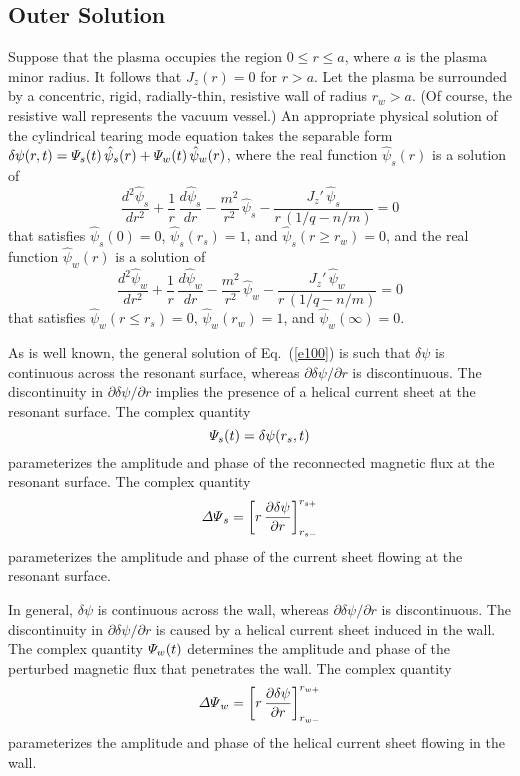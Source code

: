 \documentclass[12pt,prb,aps]{revtex4-1}
\begin{document}
\subsection{Outer Solution}\label{perfect}
Suppose that the plasma occupies the region $0\leq r\leq a$, where $a$ is the plasma  minor radius. It follows that
$J_z(r)=0$ for $r>a$. Let the plasma be surrounded by a concentric, rigid, radially-thin, resistive wall of radius $r_w>a$.  (Of course, the resistive wall represents the vacuum vessel.) 
 An appropriate
physical solution of the cylindrical tearing mode equation takes the separable form
$\delta\psi(r,t) = {\mit\Psi}_s(t)\,\hat{\psi}_s(r) + {\mit\Psi}_w(t)\,\hat{\psi}_w(r)$,
where the real function $\hat{\psi}_s(r)$ is a solution of 
\begin{equation}\label{e100}
\frac{d^2\hat{\psi}_s}{dr^2} + \frac{1}{r}\,\frac{d\hat{\psi}_s}{dr}-\frac{m^2}{r^2}\,\hat{\psi}_s - \frac{J_z'\,\hat{\psi}_s}{r\,(1/q-n/m)}= 0
\end{equation}
that satisfies
$\hat{\psi}_s(0) = 0$, 
$\hat{\psi}_s(r_s) = 1$, and
$\hat{\psi}_s(r\geq r_w) = 0$, and the real function  $\hat{\psi}_w(r)$ is a solution of 
\begin{equation}\label{e100a}
\frac{d^2\hat{\psi}_w}{dr^2} + \frac{1}{r}\,\frac{d\hat{\psi}_w}{dr}-\frac{m^2}{r^2}\,\hat{\psi}_w - \frac{J_z'\,\hat{\psi}_w}{r\,(1/q-n/m)}= 0
\end{equation}
that satisfies
$\hat{\psi}_w(r\leq r_s) = 0$,
$\hat{\psi}_w(r_w) = 1$,
and $\hat{\psi}_w(\infty) = 0$.

As is well known, the general solution of Eq.~(\ref{e100}) is such that $\delta\psi$ is continuous across the resonant surface,
whereas $\partial\delta\psi/\partial r$ is discontinuous.\cite{fkr} The discontinuity in $\partial \delta\psi/\partial r$ implies the presence of a helical  current sheet  at the resonant surface. 
The complex quantity 
\begin{equation}\label{e108}
{\mit\Psi}_s(t)= \delta\psi(r_s,t) 
\end{equation}
parameterizes the amplitude and phase of the
reconnected magnetic flux at the resonant surface.\cite{rf1993}
The complex quantity
\begin{equation}\label{e109}
{\mit\Delta\Psi}_s = \left[r\,\frac{\partial \delta\psi}{\partial r}\right]_{r_{s-}}^{r_{s+}}
\end{equation}
parameterizes the amplitude and phase of the current sheet flowing at the resonant surface. 

In general, $\delta\psi$ is continuous across the wall, whereas $\partial\delta\psi/\partial r$ is discontinuous. The discontinuity in $\partial\delta\psi/\partial r$ is caused by a helical current sheet induced in the wall. The complex quantity ${\mit\Psi}_w(t)$ determines the amplitude and
phase of the perturbed magnetic flux that penetrates the wall. The complex quantity
\begin{equation}\label{e118}
{\mit\Delta\Psi}_w = \left[r\,\frac{\partial\delta\psi}{\partial r}\right]_{r_{w-}}^{r_{w+}}
\end{equation}
parameterizes the amplitude and phase of the helical current sheet flowing in the wall.
\end{document}
